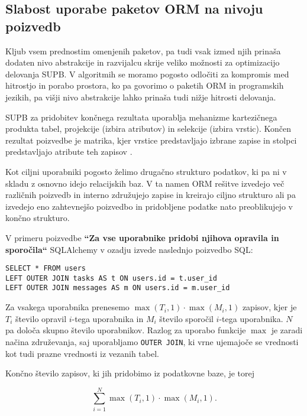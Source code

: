 \documentclass[a4paper,12pt,openright]{book}
\begin{document}
    \subsection{Slabost uporabe paketov ORM na nivoju poizvedb}
    Kljub vsem prednostim omenjenih paketov, pa tudi vsak izmed njih prinaša dodaten nivo abstrakcije in razvijalcu skrije veliko možnosti za optimizacijo delovanja SUPB. V algoritmih se moramo pogosto odločiti za kompromis med hitrostjo in porabo prostora, ko pa govorimo o paketih ORM in programskih jezikih, pa višji nivo abstrakcije lahko prinaša tudi nižje hitrosti delovanja.

    SUPB za pridobitev končnega rezultata uporablja mehanizme kartezičnega produkta tabel, projekcije (izbira atributov) in selekcije (izbira vrstic). Končen rezultat poizvedbe je matrika, kjer vrstice predstavljajo izbrane zapise in stolpci predstavljajo atribute teh zapisov \cite{keller1985algorithms}.
    
    Kot ciljni uporabniki pogosto želimo drugačno strukturo podatkov, ki pa ni v skladu z osnovno idejo relacijskih baz. V ta namen ORM rešitve izvedejo več različnih poizvedb in interno združujejo zapise in kreirajo ciljno strukturo ali pa izvedejo eno zahtevnejšo poizvedbo in pridobljene podatke nato preoblikujejo v končno strukturo.
    
    V primeru poizvedbe \textbf{``Za vse uporabnike pridobi njihova opravila in sporočila``} SQLAlchemy v ozadju izvede naslednjo poizvedbo SQL:
    \begin{verbatim}
SELECT * FROM users
LEFT OUTER JOIN tasks AS t ON users.id = t.user_id
LEFT OUTER JOIN messages AS m ON users.id = m.user_id
    \end{verbatim}

    \noindent
    Za vsakega uporabnika prenesemo $\max(T_i, 1) \cdot \max(M_i, 1)$ zapisov, kjer je $T_i$ število opravil $i$-tega uporabnika in $M_i$ število sporočil $i$-tega uporabnika. $N$ pa določa skupno število uporabnikov. Razlog za uporabo funkcije $\max$ je zaradi načina združevanja, saj uporabljamo {\tt OUTER JOIN}, ki vrne ujemajoče se vrednosti kot tudi prazne vrednosti iz vezanih tabel. 

    Končno število zapisov, ki jih pridobimo iz podatkovne baze, je torej
    
    \begin{equation}
        \sum_{i=1}^{N} \max(T_i, 1) \cdot \max(M_i, 1).
    \label{data_sum_first}
    \end{equation}
\end{document}
